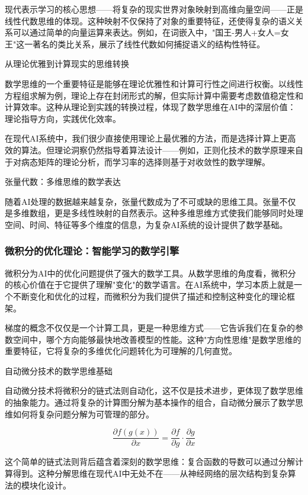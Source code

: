 现代表示学习的核心思想——将复杂的现实世界对象映射到高维向量空间——正是线性代数思维的体现。这种映射不仅保持了对象的重要特征，还使得复杂的语义关系可以通过简单的向量运算来表达。例如，在词嵌入中，"国王-男人+女人=女王"这一著名的类比关系，展示了线性代数如何捕捉语义的结构性特征。

从理论优雅到计算现实的思维转换

数学思维的一个重要特征是能够在理论优雅性和计算可行性之间进行权衡。以线性方程组求解为例，理论上存在封闭形式的解，但实际计算中需要考虑数值稳定性和计算效率。这种从理论到实践的转换过程，体现了数学思维在AI中的深层价值：理论指导方向，实践优化效率。

在现代AI系统中，我们很少直接使用理论上最优雅的方法，而是选择计算上更高效的算法。但理论洞察仍然指导着算法设计——例如，正则化技术的数学原理来自于对病态矩阵的理论分析，而学习率的选择则基于对收敛性的数学理解。

张量代数：多维思维的数学表达

随着AI处理的数据越来越复杂，张量代数成为了不可或缺的思维工具。张量不仅是多维数组，更是多线性映射的自然表示。这种多维思维方式使我们能够同时处理空间、时间、特征等多个维度的信息，为复杂AI系统的设计提供了数学基础。

\subsubsection{微积分的优化理论：智能学习的数学引擎}

微积分为AI中的优化问题提供了强大的数学工具。从数学思维的角度看，微积分的核心价值在于它提供了理解"变化"的数学语言。在AI系统中，学习本质上就是一个不断变化和优化的过程，而微积分为我们提供了描述和控制这种变化的理论框架。

梯度的概念不仅仅是一个计算工具，更是一种思维方式——它告诉我们在复杂的参数空间中，哪个方向能够最快地改善模型的性能。这种"方向性思维"是数学思维的重要特征，它将复杂的多维优化问题转化为可理解的几何直觉。

自动微分技术的数学思维基础

自动微分技术将微积分的链式法则自动化，这不仅是技术进步，更体现了数学思维的抽象能力。通过将复杂的计算图分解为基本操作的组合，自动微分展示了数学思维如何将复杂问题分解为可管理的部分。

$$\frac{\partial f(g(x))}{\partial x} = \frac{\partial f}{\partial g} \cdot \frac{\partial g}{\partial x}$$

这个简单的链式法则背后蕴含着深刻的数学思维：复合函数的导数可以通过分解计算得到。这种分解思维在现代AI中无处不在——从神经网络的层次结构到复杂算法的模块化设计。

